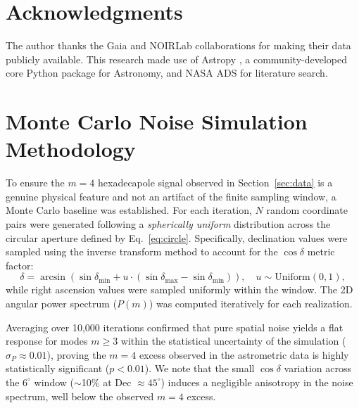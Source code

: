 \documentclass[11pt,a4paper]{article}
\theoremstyle{remark}
\begin{document}
\section*{Acknowledgments}

The author thanks the Gaia and NOIRLab collaborations for making their data publicly available. This research made use of Astropy \cite{astropy2022}, a community-developed core Python package for Astronomy, and NASA ADS for literature search.

\appendix
\section{Monte Carlo Noise Simulation Methodology}
\label{app:montecarlo}

To ensure the $m=4$ hexadecapole signal observed in Section~\ref{sec:data} is a genuine physical feature and not an artifact of the finite sampling window, a Monte Carlo baseline was established. For each iteration, $N$ random coordinate pairs were generated following a \textit{spherically uniform} distribution across the circular aperture defined by Eq.~\ref{eq:circle}. Specifically, declination values were sampled using the inverse transform method to account for the $\cos\delta$ metric factor:
\[
\delta = \arcsin\left(\sin\delta_{\text{min}} + u \cdot (\sin\delta_{\text{max}} - \sin\delta_{\text{min}})\right), \quad u \sim \text{Uniform}(0,1),
\]
while right ascension values were sampled uniformly within the window. The 2D angular power spectrum ($P(m)$) was computed iteratively for each realization.

Averaging over 10,000 iterations confirmed that pure spatial noise yields a flat response for modes $m \ge 3$ within the statistical uncertainty of the simulation ($\sigma_P \approx 0.01$), proving the $m=4$ excess observed in the astrometric data is highly statistically significant ($p < 0.01$). We note that the small $\cos\delta$ variation across the $6^\circ$ window ($\sim$10\% at Dec $\approx 45^\circ$) induces a negligible anisotropy in the noise spectrum, well below the observed $m=4$ excess.
\end{document}
